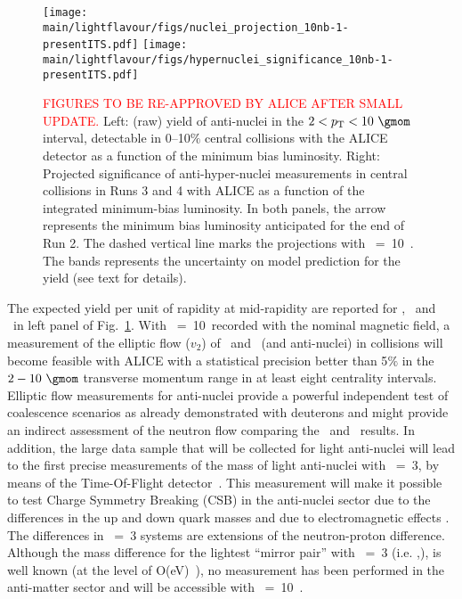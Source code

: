 \begin{figure}%
\begin{center}
\texttt{[image: \\main/lightflavour/figs/nuclei\_projection\_10nb-1-presentITS.pdf]}
\texttt{[image: \\main/lightflavour/figs/hypernuclei\_significance\_10nb-1-presentITS.pdf]}
\end{center}
\caption{\textcolor{red}{FIGURES TO BE RE-APPROVED BY ALICE AFTER SMALL UPDATE.}
Left: (raw) yield of anti-nuclei in the $2 <\pT< 10~\gmom$ interval, detectable in 0--10$\%$ central \PbPb collisions with the ALICE detector as a function of the minimum bias luminosity. 
Right: Projected significance of anti-hyper-nuclei measurements in central \PbPb collisions in Runs 3 and 4 with ALICE as a function of the integrated minimum-bias luminosity. In both panels, the arrow represents the minimum bias \PbPb luminosity anticipated for the end of Run 2. The dashed vertical line marks the projections with \Lint~=~10~\nbInv. The bands represents the uncertainty on model prediction for the yield (see text for details).
}
\label{fig:yieldrun34}
\end{figure}

The expected yield per unit of rapidity at mid-rapidity are reported for \antid, \antihethree\ and \antihefour\ in left panel of Fig.~\ref{fig:yieldrun34}.
With \Lint~=~10~\nbInv recorded with the nominal magnetic field, a measurement of the elliptic flow ($v_2$) of \hethree~and \tritium~(and anti-nuclei) in \PbPb collisions will become feasible with ALICE with a statistical precision better than 5$\%$ in the $2-10~\gmom$ transverse momentum range in at least eight centrality intervals. 
Elliptic flow measurements for anti-nuclei provide a powerful independent test of coalescence scenarios as already demonstrated with deuterons \cite{Acharya:2017dmc} and might provide an indirect assessment of the neutron flow comparing the \hethree\ and \tritium\ results. 
%
In addition, the large data sample that will be collected for light anti-nuclei will lead to the first precise measurements of the mass of light anti-nuclei with \Anucl~=~3, by means of the Time-Of-Flight detector~\cite{Adam:2015pna}. 
This measurement will make it possible to test Charge Symmetry Breaking (CSB) in the anti-nuclei sector due to the differences in the up and down quark masses and due to electromagnetic effects \cite{Miller:1990ky}. 
The differences in \Anucl~=~3 systems are extensions of the neutron-proton difference. Although the mass difference for the lightest ``mirror pair'' with \Anucl~=~3 (i.e. \tritium,\hethree), is well known (at the level of O(eV)~\cite{Audi:2002rp}), no measurement has been performed in the anti-matter sector and will be accessible with \Lint~=~10~\nbInv. 

